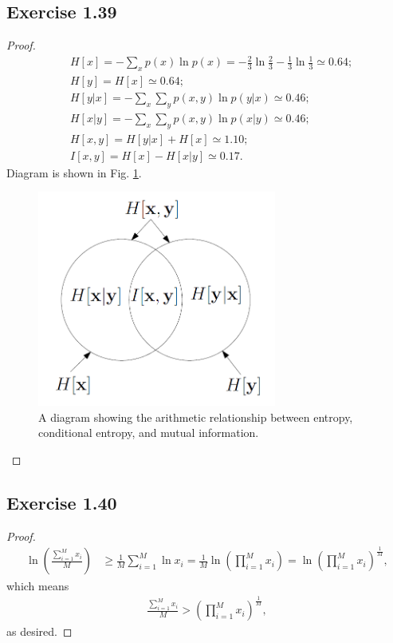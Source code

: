 \documentclass[11pt]{article}
\theoremstyle{definition}
\begin{document}
\subsection{Exercise 1.39}
\begin{proof}
\begin{align*}
&H[x] = -\sum_{x}p(x)\ln p(x) = -\frac{2}{3}\ln \frac{2}{3} -\frac{1}{3}\ln \frac{1}{3} \simeq 0.64;\\
&H[y] = H[x] \simeq 0.64; \\
&H[y|x] =  -\sum_x\sum_yp(x,y)\ln p(y|x) \simeq 0.46;\\
&H[x|y] =  -\sum_x\sum_yp(x,y)\ln p(x|y) \simeq 0.46;\\
&H[x,y] = H[y|x] + H[x] \simeq 1.10; \\
&I[x,y] = H[x] - H[x|y] \simeq 0.17.
\end{align*}
Diagram is shown in Fig. \ref{fig:fig1}.
\begin{figure}[!hbtp] 
\centering 
\includegraphics[width=0.7\textwidth]{./res/ch1-ex39.png} 
\caption{A diagram showing the arithmetic relationship between entropy, conditional entropy, and mutual information.} 
\label{fig:fig1} 
\end{figure}
\end{proof}

\subsection{Exercise 1.40}
\begin{proof}
\begin{align*}
\ln\left(\frac{\sum_{i=1}^Mx_i}{M}\right) &\geq \frac{1}{M}\sum_{i=1}^M\ln x_i 
= \frac{1}{M}\ln\left(\prod_{i=1}^Mx_i\right) 
= \ln\left(\prod_{i=1}^Mx_i\right)^{\frac{1}{M}},
\end{align*}
which means
\begin{align*}
\frac{\sum_{i=1}^Mx_i}{M} > \left(\prod_{i=1}^Mx_i\right)^{\frac{1}{M}},
\end{align*}
as desired.
\end{proof}
\end{document}
